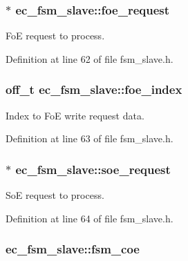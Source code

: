 \subsubsection[{foe\-\_\-request}]{$\ast$ {\bf ec\-\_\-fsm\-\_\-slave\-::foe\-\_\-request}}\label{structec__fsm__slave_a3fa15bb678542863b36f3e79081df19a}


\-Fo\-E request to process. 



\-Definition at line 62 of file fsm\-\_\-slave.\-h.

\subsubsection[{foe\-\_\-index}]{\setlength{\rightskip}{0pt plus 5cm}off\-\_\-t {\bf ec\-\_\-fsm\-\_\-slave\-::foe\-\_\-index}}\label{structec__fsm__slave_aad54bfb331ddd0f5de61d24b415b03fe}


\-Index to \-Fo\-E write request data. 



\-Definition at line 63 of file fsm\-\_\-slave.\-h.

\subsubsection[{soe\-\_\-request}]{$\ast$ {\bf ec\-\_\-fsm\-\_\-slave\-::soe\-\_\-request}}\label{structec__fsm__slave_a927d20b1685eea5160c96ca9f8748d12}


\-So\-E request to process. 



\-Definition at line 64 of file fsm\-\_\-slave.\-h.

\subsubsection[{fsm\-\_\-coe}]{ {\bf ec\-\_\-fsm\-\_\-slave\-::fsm\-\_\-coe}}\label{structec__fsm__slave_ac9f6c23ca16927be8dab824caf95878f}


